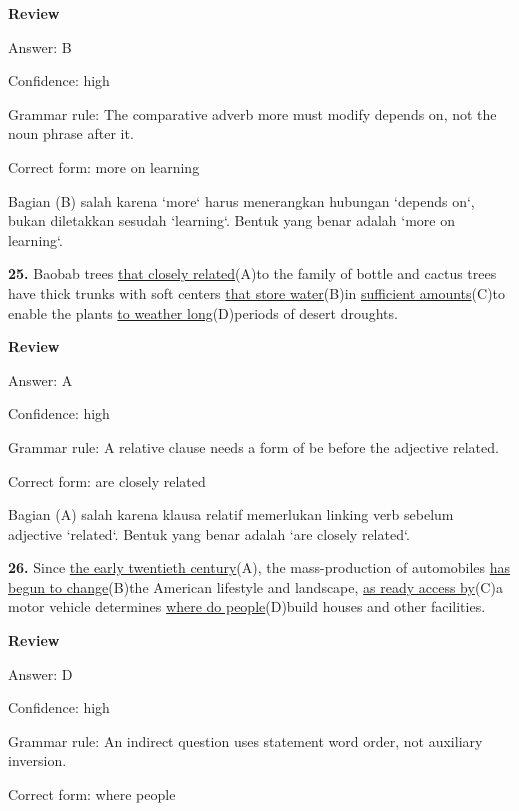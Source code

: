 \documentclass[12pt]{article}
\begin{document}
\par
\begingroup
\setlength{\parskip}{0pt}
\setlength{\parindent}{0pt}
\textbf{Review}\par
Answer: B\par
Confidence: high\par
Grammar rule: The comparative adverb more must modify depends on, not the noun phrase after it.\par
Correct form: more on learning\par
Bagian (B) salah karena `more` harus menerangkan hubungan `depends on`, bukan diletakkan sesudah `learning`. Bentuk yang benar adalah `more on learning`.\par
\endgroup
\par
\vspace{\questionblockgap}
\noindent\textbf{25.} Baobab trees \uline{that closely related}(A)to the family of bottle and cactus trees have thick trunks with soft centers \uline{that store water}(B)in \uline{sufficient amounts}(C)to enable the plants \uline{to weather long}(D)periods of desert droughts.
\par
\begingroup
\setlength{\parskip}{0pt}
\setlength{\parindent}{0pt}
\textbf{Review}\par
Answer: A\par
Confidence: high\par
Grammar rule: A relative clause needs a form of be before the adjective related.\par
Correct form: are closely related\par
Bagian (A) salah karena klausa relatif memerlukan linking verb sebelum adjective `related`. Bentuk yang benar adalah `are closely related`.\par
\endgroup
\par
\vspace{\questionblockgap}
\noindent\textbf{26.} Since \uline{the early twentieth century}(A), the mass-production of automobiles \uline{has begun to change}(B)the American lifestyle and landscape, \uline{as ready access by}(C)a motor vehicle determines \uline{where do people}(D)build houses and other facilities.
\par
\begingroup
\setlength{\parskip}{0pt}
\setlength{\parindent}{0pt}
\textbf{Review}\par
Answer: D\par
Confidence: high\par
Grammar rule: An indirect question uses statement word order, not auxiliary inversion.\par
Correct form: where people\par
\end{document}

